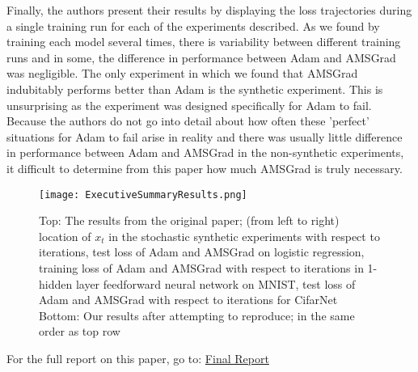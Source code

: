 \documentclass[letterpaper, 10 pt, conference]{ieeeconf}  %
\begin{document}
Finally, the authors present their results by displaying the loss trajectories during a single training run for each of the experiments described. As we found by training each model several times, there is variability between different training runs and in some, the difference in performance between Adam and AMSGrad was negligible. The only experiment in which we found that AMSGrad indubitably performs better than Adam is the synthetic experiment. This is unsurprising as the experiment was designed specifically for Adam to fail. Because the authors do not go into detail about how often these 'perfect' situations for Adam to fail arise in reality and there was usually little difference in performance between Adam and AMSGrad in the non-synthetic experiments, it difficult to determine from this paper how much AMSGrad is truly necessary. 


\begin{figure*}
  \texttt{[image: ExecutiveSummaryResults.png]}
  \label{fig:test2}
\caption[]{Top: The results from the original paper; (from left to right) location of $x_{t}$ in the stochastic synthetic experiments with respect to iterations, test loss of Adam and AMSGrad on logistic regression, training loss of Adam and AMSGrad with respect to iterations in 1-hidden layer feedforward neural network on MNIST, test loss of Adam and AMSGrad with respect to iterations for CifarNet \\
Bottom: Our results after attempting to reproduce; in the same order as top row}
\end{figure*}

For the full report on this paper, go to: \href{https://github.com/tamirbennatan/Adam-Convergence/blob/master/Report/FinalReport.pdf}{Final Report}
 
\addtolength{\textheight}{-12cm}   %

\end{document}
